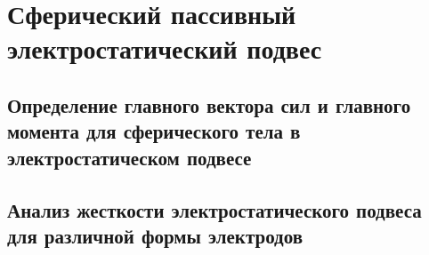 \chapter{Сферический пассивный электростатический подвес} \label{chapt3}

\section{Определение главного вектора сил и главного момента для сферического тела в электростатическом подвесе} \label{sect3_1}

\section{Анализ жесткости электростатического подвеса для различной формы электродов}\label{sect3_2}

